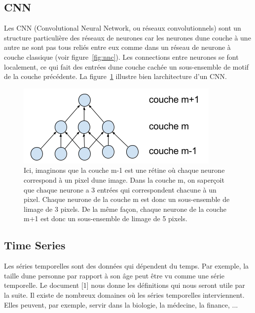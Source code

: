 \documentclass[11pt]{sdm}
\begin{document}
	\subsection{CNN}
		Les CNN (Convolutional Neural Network, ou r\'eseaux convolutionnels) sont un structure particuli\`ere des r\'eseaux de neurones car les neurones d\textquotesingle une couche \`a une autre ne sont pas tous reli\'es entre eux comme dans un r\'eseau de neurone \`a couche classique (voir figure~\ref{fig:nnc}). Les connections entre neurones se font localement, ce qui fait des entr\'ees d\textquotesingle une couche cach\'ee un sous-ensemble de motif de la couche pr\'ec\'edente. La figure~\ref{fig:cnn} illustre bien l\textquotesingle architecture d'un CNN.

		\begin{figure}[!ht]
			\centering
			\includegraphics[natwidth=375,natheight=152]{architectureCNN.png}
			\caption{Ici, imaginons que la couche m-1 est une r\'etine o\`u chaque neurone correspond \`a un pixel d\textquotesingle une image. Dans la couche m, on s\textquotesingle aper\c coit que chaque neurone a 3 entr\'ees qui correspondent chacune \`a un pixel. Chaque neurone de la couche m est donc un sous-ensemble de l\textquotesingle image de 3 pixels. De la m\^eme fa\c con, chaque neurone de la couche m+1 est donc un sous-ensemble de l\textquotesingle image de 5 pixels.}
			\label{fig:cnn}
		\end{figure}


	\subsection{Time Series}
		Les s\'eries temporelles sont des donn\'ees qui d\'ependent du temps. Par exemple, la taille d\textquotesingle une personne par rapport \`a son âge peut \^etre vu comme une s\'erie temporelle. Le document [1] nous donne les d\'efinitions qui nous seront utile par la suite.
		Il existe de nombreux domaines o\`u les s\'eries temporelles interviennent. Elles peuvent, par exemple, servir dans la biologie, la m\'edecine, la finance, ...
\end{document}
